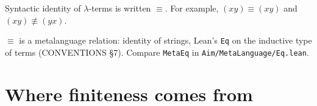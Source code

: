 \documentclass[11pt]{article}
\begin{document}
\begin{convention}\label{conv:syntactic-identity}
Syntactic identity of $\lambda$-terms is written $\equiv$. For example,
$(xy) \equiv (xy)$ and $(xy) \not\equiv (yx)$.
\end{convention}

\begin{remark}
$\equiv$ is a metalanguage relation: identity of strings, Lean's
\texttt{Eq} on the inductive type of terms (CONVENTIONS \S7). Compare
\texttt{MetaEq} in \texttt{Aim/MetaLanguage/Eq.lean}.
\end{remark}

\section{Where finiteness comes from}\label{sec:finiteness}
\end{document}
